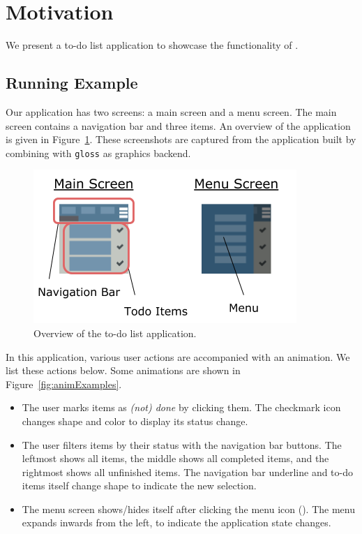 \section{Motivation}
\label{sec:motivation}

We present a to-do list application to showcase the
functionality of \dsl{}.

\subsection{Running Example}

Our application has two screens: a main screen and a menu screen. The main screen contains a navigation bar and three items. An overview of the application is given in Figure~\ref{fig:appOverview}. These screenshots are captured from the application built by combining \dsl{} with \texttt{gloss} as graphics backend.

\begin{figure}[!htbp]
\centering
\includegraphics[width=\figscale\textwidth]{pictures/app_overview}
\caption{Overview of the to-do list application.}
\label{fig:appOverview}
\end{figure}

In this application, various user actions are accompanied with an animation.
We list these actions below. Some animations are shown in Figure~\ref{fig:animExamples}.
\begin{itemize}
\item The user marks items as \emph{(not) done} by clicking them. The
checkmark icon changes shape and color to display its status change.
\item The user filters items by their status with the navigation bar
buttons. The leftmost shows all items, the middle shows all completed items, and
the rightmost shows all unfinished items. The navigation bar underline and to-do
items itself change shape to indicate the new selection.
\item The menu screen shows/hides itself after clicking the menu icon (\faBars). The
menu expands inwards from the left, to indicate the application state changes.
\end{itemize}

